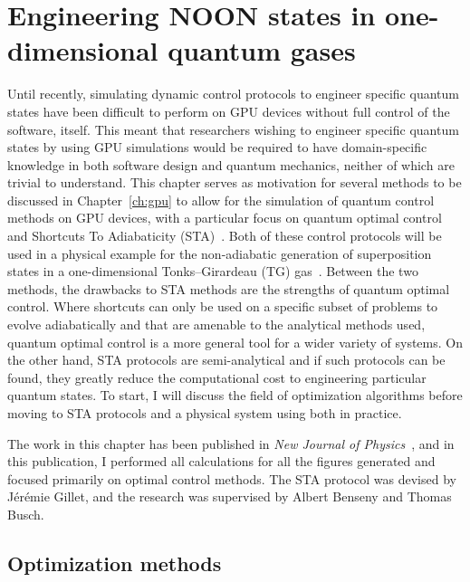 \chapter{Engineering NOON states in one-dimensional quantum gases}
\label{ch:1d}

Until recently, simulating dynamic control protocols to engineer specific quantum states have been difficult to perform on GPU devices without full control of the software, itself.
This meant that researchers wishing to engineer specific quantum states by using GPU simulations would be required to have domain-specific knowledge in both software design and quantum mechanics, neither of which are trivial to understand.
This chapter serves as motivation for several methods to be discussed in Chapter~\ref{ch:gpu} to allow for the simulation of quantum control methods on GPU devices, with a particular focus on quantum optimal control~\cite{werschnik2007} and Shortcuts To Adiabaticity (STA)~\cite{guery2019}.
Both of these control protocols will be used in a physical example for the non-adiabatic generation of superposition states in a one-dimensional Tonks--Girardeau (TG) gas~\cite{schloss2016}.
Between the two methods, the drawbacks to STA methods are the strengths of quantum optimal control.
Where shortcuts can only be used on a specific subset of problems to evolve adiabatically and that are amenable to the analytical methods used, quantum optimal control is a more general tool for a wider variety of systems.
On the other hand, STA protocols are semi-analytical and if such protocols can be found, they greatly reduce the computational cost to engineering particular quantum states.
To start, I will discuss the field of optimization algorithms before moving to STA protocols and a physical system using both in practice.

The work in this chapter has been published in \textit{New Journal of Physics}~\cite{schloss2016}, and in this publication, I performed all calculations for all the figures generated and focused primarily on optimal control methods.
The STA protocol was devised by J\'er\'emie Gillet, and the research was supervised by Albert Benseny and Thomas Busch.

\section{Optimization methods}


